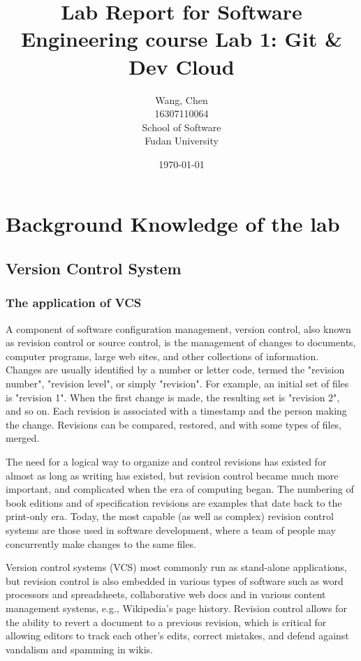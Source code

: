 \documentclass[a4paper]{report}
\title{Lab Report for Software Engineering course \newline
 Lab 1: Git \& Dev Cloud}
\author{Wang, Chen \\ 16307110064 \\ School of Software\\ Fudan University}
\date{\today}
\begin{document}
\maketitle

\tableofcontents

\chapter{Background Knowledge of the lab}
\section{Version Control System}
\subsection{The application of VCS}
\par
A component of software configuration management, version control, also known as revision control or source control, is the management of changes to documents, computer programs, large web sites, and other collections of information. Changes are usually identified by a number or letter code, termed the "revision number", "revision level", or simply "revision". For example, an initial set of files is "revision 1". When the first change is made, the resulting set is "revision 2", and so on. Each revision is associated with a timestamp and the person making the change. Revisions can be compared, restored, and with some types of files, merged.

\par
The need for a logical way to organize and control revisions has existed for almost as long as writing has existed, but revision control became much more important, and complicated when the era of computing began. The numbering of book editions and of specification revisions are examples that date back to the print-only era. Today, the most capable (as well as complex) revision control systems are those used in software development, where a team of people may concurrently make changes to the same files.

\par
Version control systems (VCS) most commonly run as stand-alone applications, but revision control is also embedded in various types of software such as word processors and spreadsheets, collaborative web docs and in various content management systems, e.g., Wikipedia's page history. Revision control allows for the ability to revert a document to a previous revision, which is critical for allowing editors to track each other's edits, correct mistakes, and defend against vandalism and spamming in wikis.
\end{document}

